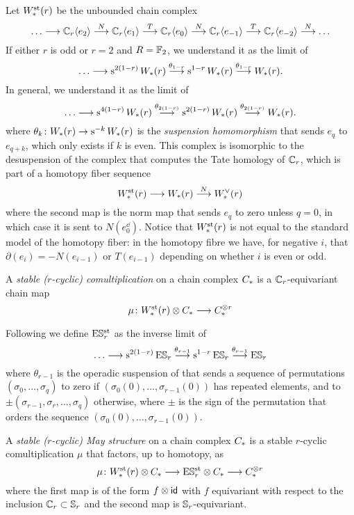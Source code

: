 Let $W^{\mathrm{st}}_{*}(r)$ be the unbounded chain complex
\[
\ldots\longrightarrow \mathbb{C}_r\langle e_2\rangle \overset{N}{\longrightarrow}
\mathbb{C}_r\langle e_1\rangle \overset{T}{\longrightarrow}
\mathbb{C}_r\langle e_0\rangle \overset{N}{\longrightarrow}
\mathbb{C}_r\langle e_{-1}\rangle \overset{T}{\longrightarrow}
\mathbb{C}_r\langle e_{-2}\rangle \overset{N}{\longrightarrow}
\ldots
\]
If either $r$ is odd or $r=2$ and $R=\mathbb{F}_2$, we understand it as the limit of
\[
\ldots\longrightarrow \operatorname{s}^{2(1-r)}W_{*}(r)\overset{\theta_{1-r}}{\longrightarrow} \operatorname{s}^{1-r} W_{*}(r) \overset{\theta_{1-r}}{\longrightarrow} W_{*}(r).
\]
In general, we understand it as the limit of
\[
\ldots\longrightarrow \operatorname{s}^{4(1-r)}W_{*}(r)\overset{\theta_{2(1-r)}}{\longrightarrow} \operatorname{s}^{2(1-r)} W_{*}(r) \overset{\theta_{2(1-r)}}{\longrightarrow} W_{*}(r).
\]
where $\theta_{k}\colon W_{*}(r)\to \operatorname{s}^{-k} W_{*}(r)$ is the \emph{suspension homomorphism} that sends $e_{q}$ to $e_{q+k}$, which only exists if $k$ is even. %
 This complex is isomorphic to the desuspension of the complex that computes the Tate homology of $\mathbb{C}_r$, which is part of a homotopy fiber sequence
\[
	W^{\mathrm{st}}_{*}(r)\longrightarrow W_{*}(r)\overset{N}{\longrightarrow} W^\vee_{*}(r)
\]
where the second map is the norm map that sends $e_q$ to zero unless $q=0$, in which case it is sent to $N(e_0^\dd)$. Notice that $W^{\mathrm{st}}_{*}(r)$ is not equal to the standard model of the homotopy fiber: in the homotopy fibre we have, for negative $i$, that $\partial(e_i) = -N(e_{i-1})$ or $T(e_{i-1})$ depending on whether $i$ is even or odd. 



\begin{definition} A \emph{stable ($r$-cyclic) comultiplication} on a chain complex $C_{*}$ is a $\mathbb{C}_r$-equivariant chain map
\[
\mu\colon W^{\mathrm{st}}_{*}(r)\otimes C_{*}\longrightarrow C_{*}^{\otimes r}
\]
\end{definition}

Following \cite{Gill2020} we define $\mathrm{E}\mathbb{S}^{\mathrm{st}}_r$ as the inverse limit of
\[
	\ldots \longrightarrow \operatorname{s}^{2(1-r)} \mathrm{E}\mathbb{S}_r\overset{\theta_{r-1}}{\longrightarrow }\operatorname{s}^{1-r} \mathrm{E}\mathbb{S}_r\overset{\theta_{r-1}}{\longrightarrow} \mathrm{E}\mathbb{S}_r
\]
where $\theta_{r-1}$ is the operadic suspension of \cite{berger2004combinatorial} that sends a sequence of permutations $(\sigma_0,\ldots,\sigma_q)$ to zero if $(\sigma_0(0),\ldots,\sigma_{r-1}(0))$ has repeated elements, and to $\pm (\sigma_{r-1},\sigma_r,\ldots,\sigma_q)$ otherwise, where $\pm$ is the sign of the permutation that orders the sequence $(\sigma_0(0),\ldots,\sigma_{r-1}(0))$.

\begin{definition} A \emph{stable ($r$-cyclic) May structure} on a chain complex $C_{*}$ is a stable $r$-cyclic comultiplication $\mu$ that factors, up to homotopy, as
\[
\mu\colon W^{\mathrm{st}}_{*}(r)\otimes C_{*}\longrightarrow \mathrm{E}\mathbb{S}^{\mathrm{st}}_r\otimes C_{*}\longrightarrow  C_{*}^{\otimes r}
\]
where the first map is of the form $f\otimes \mathsf{id}$ with $f$ equivariant with respect to the inclusion $\mathbb{C}_r\subset \mathbb{S}_r$ and the second map is $\mathbb{S}_r$-equivariant.
\end{definition}

